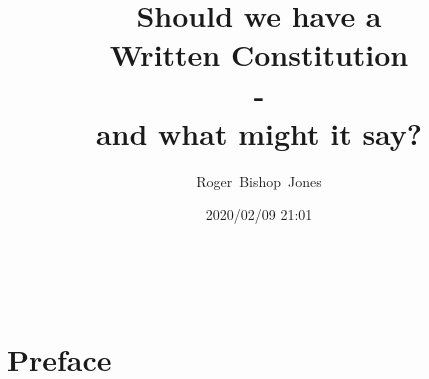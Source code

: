 \documentclass[14pt,titlepage]{extarticle}
\title{\LARGE \bf Should we have a \\Written Constitution \\- \\and what might it say?}
\author{Roger~Bishop~Jones}
\date{\small 2020/02/09 21:01}
\newcommand{\ignore}[1]{}
\begin{document}

                               
\begin{titlepage}
  \maketitle
  
 



 

\end{titlepage}

\ \

\ignore{
\begin{centering}
{\LARGE \bf Should we have a \\Written Constitution?\\ - \\and what might it say?\\}
\end{centering}
}%

\setcounter{tocdepth}{2}
{\parskip-0pt\tableofcontents}




\section*{Preface}
\end{document}

